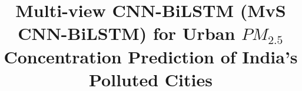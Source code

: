 \documentclass[a4paper, fleqn]{cas-sc}
\theoremstyle{definition}
\theoremstyle{remark}
\begin{document}
\let\WriteBookmarks\relax
\def\floatpagepagefraction{1}
\def\textpagefraction{.001}



\title [mode = title]{Multi-view CNN-BiLSTM (MvS CNN-BiLSTM) for Urban $PM_{2.5}$ Concentration Prediction of India's Polluted Cities}  

\end{document}
